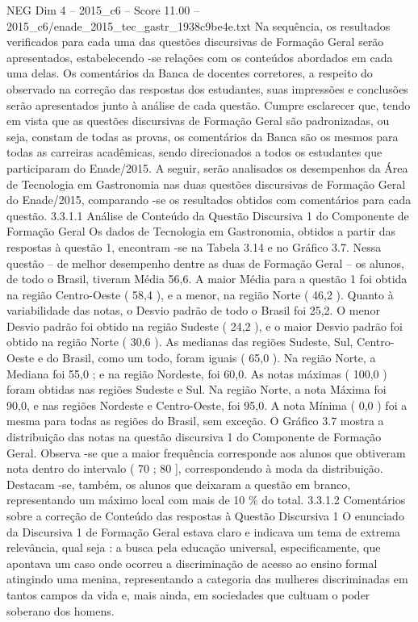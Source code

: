 \begin{textsample}{NEG Dim 4 – 2015\_c6 – Score 11.00 – 2015\_c6/enade\_2015\_tec\_gastr\_1938c9be4e.txt}
Na sequência, os resultados verificados para cada uma das questões discursivas de Formação Geral serão apresentados, estabelecendo -se relações com os conteúdos abordados em cada uma delas.
Os comentários da Banca de docentes corretores, a respeito do observado na correção das respostas dos estudantes, suas impressões e conclusões serão apresentados junto à análise de cada questão.
Cumpre esclarecer que, tendo em vista que as questões discursivas de Formação Geral são padronizadas, ou seja, constam de todas as provas, os comentários da Banca são os mesmos para todas as carreiras acadêmicas, sendo direcionados a todos os estudantes que participaram do Enade/2015.
A seguir, serão analisados os desempenhos da Área de Tecnologia em Gastronomia nas duas questões discursivas de Formação Geral do Enade/2015, comparando -se os resultados obtidos com comentários para cada questão. 3.3.1.1 Análise de Conteúdo da Questão Discursiva 1 do Componente de Formação Geral Os dados de Tecnologia em Gastronomia, obtidos a partir das respostas à questão 1, encontram -se na Tabela 3.14 e no Gráfico 3.7.
Nessa questão – de melhor desempenho dentre as duas de Formação Geral – os alunos, de todo o Brasil, tiveram Média 56,6.
A maior Média para a questão 1 foi obtida na região Centro-Oeste ( 58,4 ), e a menor, na região Norte ( 46,2 ).
Quanto à variabilidade das notas, o Desvio padrão de todo o Brasil foi 25,2.
O menor Desvio padrão foi obtido na região Sudeste ( 24,2 ), e o maior Desvio padrão foi obtido na região Norte ( 30,6 ).
As medianas das regiões Sudeste, Sul, Centro-Oeste e do Brasil, como um todo, foram iguais ( 65,0 ).
Na região Norte, a Mediana foi 55,0 ; e na região Nordeste, foi 60,0.
As notas máximas ( 100,0 ) foram obtidas nas regiões Sudeste e Sul.
Na região Norte, a nota Máxima foi 90,0, e nas regiões Nordeste e Centro-Oeste, foi 95,0.
A nota Mínima ( 0,0 ) foi a mesma para todas as regiões do Brasil, sem exceção.
O Gráfico 3.7 mostra a distribuição das notas na questão discursiva 1 do Componente de Formação Geral.
Observa -se que a maior frequência corresponde aos alunos que obtiveram nota dentro do intervalo ( 70 ; 80 ], correspondendo à moda da distribuição.
Destacam -se, também, os alunos que deixaram a questão em branco, representando um máximo local com mais de 10 \% do total. 3.3.1.2 Comentários sobre a correção de Conteúdo das respostas à Questão Discursiva 1 O enunciado da Discursiva 1 de Formação Geral estava claro e indicava um tema de extrema relevância, qual seja : a busca pela educação universal, especificamente, que apontava um caso onde ocorreu a discriminação de acesso ao ensino formal atingindo uma menina, representando a categoria das mulheres discriminadas em tantos campos da vida e, mais ainda, em sociedades que cultuam o poder soberano dos homens.

\end{textsample}
